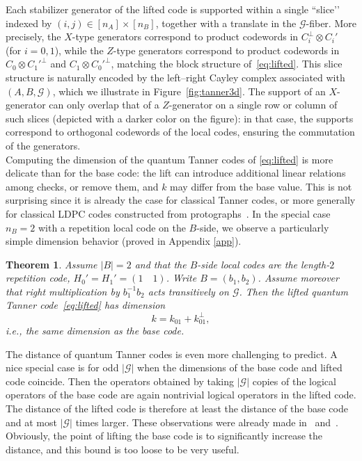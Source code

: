 \documentclass[a4paper,onecolumn,11pt]{quantumarticle}
\def\G{\mathcal{G}}
\newtheorem{theorem}{Theorem}
\begin{document}
Each stabilizer generator of the lifted code is supported  within a single “slice’’ indexed by $(i,j)\in[n_A]\times[n_B]$, together with a translate in the $\G$-fiber.  
More precisely, the $X$-type generators correspond to product codewords in
$C_i^\perp\otimes C_i'$ (for $i=0,1$), while the $Z$-type generators correspond to product codewords in
$C_0\otimes {C_1'}^\perp$ and $C_1\otimes {C_0'}^\perp$, matching the block structure of~\eqref{eq:lifted}.  
This slice structure is naturally encoded by the left--right Cayley complex associated with $(A,B,\G)$, which we illustrate in Figure~\ref{fig:tanner3d}.
The support of an $X$-generator can only overlap that of a $Z$-generator on a single row or column of such  slices (depicted with a darker color on the figure): in that case, the supports correspond to orthogonal codewords of the local codes, ensuring the commutation of the generators.\\



Computing the dimension of the quantum Tanner codes of \eqref{eq:lifted} is more delicate than for the base code: the lift can introduce additional linear relations among checks, or remove them, and $k$ may differ from the base value.  This is not surprising since it is already the case for classical Tanner codes, or more generally for classical LDPC codes constructed from protographs~\cite{tho03}.
In the special case $n_B=2$ with a repetition local code on the $B$-side, we observe a particularly simple dimension behavior (proved in Appendix \ref{app}).




\begin{theorem}\label{thm}
Assume $|B|=2$ and that the $B$-side local codes are the length-$2$ repetition code, $H_0'=H_1'= (1 \quad 1)$.
Write $B=(b_1,b_2)$.  Assume moreover that right multiplication by $b_1^{-1}b_2$ acts transitively on $\G$.
Then the lifted quantum Tanner code~\eqref{eq:lifted} has dimension
\[
k = k_{01} + k_{01}^\perp,
\]
i.e., the same dimension as the base code.
\end{theorem}






The distance of quantum Tanner codes is even more challenging to predict. A nice special case is for odd $|\G|$ when the dimensions of the base code and lifted code coincide. Then the operators obtained by taking $|\G|$ copies of the logical operators of the base code are again nontrivial logical operators in the lifted code. The distance of the lifted code is therefore at least the distance of the base code and at most $|\G|$ times larger. These observations were already made in~\cite{GZ25} and~\cite{SRB25}. Obviously, the point of lifting the base code is to significantly increase the distance, and this bound is too loose to be very useful.\\
\end{document}

